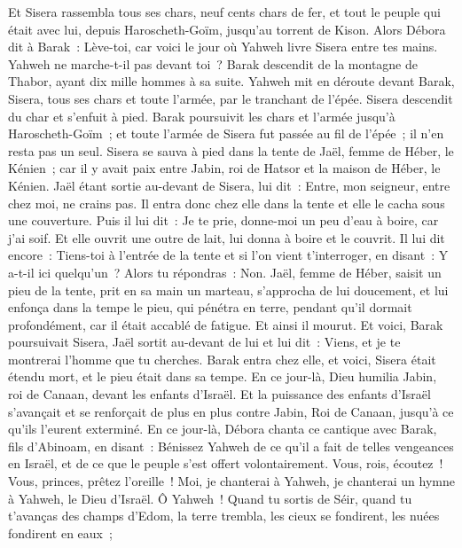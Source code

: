 \begin{multicols}{2}
Et Sisera rassembla tous ses chars, neuf cents chars de fer, et tout le peuple qui était avec lui, depuis Haroscheth-Goïm, jusqu'au torrent de Kison.
Alors Débora dit à Barak~: Lève-toi, car voici le jour où Yahweh livre Sisera entre tes mains. Yahweh ne marche-t-il pas devant toi~? Barak descendit de la montagne de Thabor, ayant dix mille hommes à sa suite.
Yahweh mit en déroute devant Barak, Sisera, tous ses chars et toute l'armée, par le tranchant de l'épée. Sisera descendit du char et s'enfuit à pied.
Barak poursuivit les chars et l'armée jusqu'à Haroscheth-Goïm~; et toute l'armée de Sisera fut passée au fil de l'épée~; il n'en resta pas un seul.
Sisera se sauva à pied dans la tente de Jaël, femme de Héber, le Kénien~; car il y avait paix entre Jabin, roi de Hatsor et la maison de Héber, le Kénien.
Jaël étant sortie au-devant de Sisera, lui dit~: Entre, mon seigneur, entre chez moi, ne crains pas. Il entra donc chez elle dans la tente et elle le cacha sous une couverture.
Puis il lui dit~: Je te prie, donne-moi un peu d'eau à boire, car j'ai soif. Et elle ouvrit une outre de lait, lui donna à boire et le couvrit.
Il lui dit encore~: Tiens-toi à l'entrée de la tente et si l'on vient t'interroger, en disant~: Y a-t-il ici quelqu'un~? Alors tu répondras~: Non.
Jaël, femme de Héber, saisit un pieu de la tente, prit en sa main un marteau, s'approcha de lui doucement, et lui enfonça dans la tempe le pieu, qui pénétra en terre, pendant qu'il dormait profondément, car il était accablé de fatigue. Et ainsi il mourut.
Et voici, Barak poursuivait Sisera, Jaël sortit au-devant de lui et lui dit~: Viens, et je te montrerai l'homme que tu cherches. Barak entra chez elle, et voici, Sisera était étendu mort, et le pieu était dans sa tempe.
En ce jour-là, Dieu humilia Jabin, roi de Canaan, devant les enfants d'Israël.
Et la puissance des enfants d'Israël s'avançait et se renforçait de plus en plus contre Jabin, Roi de Canaan, jusqu'à ce qu'ils l'eurent exterminé.
\VerseOne{}En ce jour-là, Débora chanta ce cantique avec Barak, fils d'Abinoam, en disant~:
Bénissez Yahweh de ce qu'il a fait de telles vengeances en Israël, et de ce que le peuple s'est offert volontairement.
Vous, rois, écoutez~! Vous, princes, prêtez l'oreille~! Moi, je chanterai à Yahweh, je chanterai un hymne à Yahweh, le Dieu d'Israël.
Ô Yahweh~! Quand tu sortis de Séir, quand tu t'avanças des champs d'Edom, la terre trembla, les cieux se fondirent, les nuées fondirent en eaux~;

\end{multicols}
